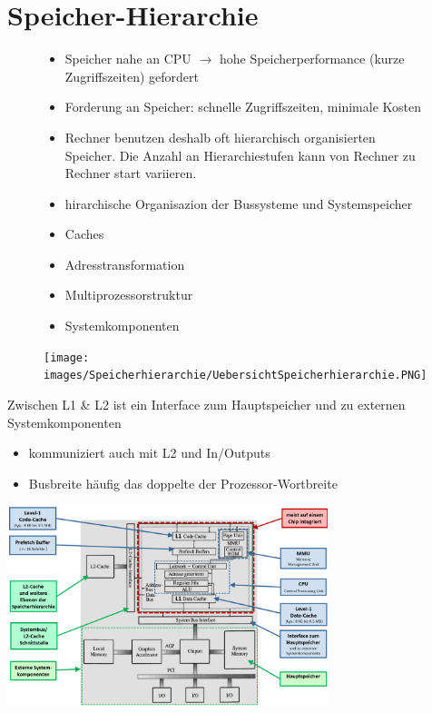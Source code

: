




\section{Speicher-Hierarchie}

\begin{figure}[htbp]

	\begin{minipage}{0.5\textwidth}		
		\begin{itemize}[noitemsep,topsep=0pt]
			\item Speicher nahe an CPU $\rightarrow$ hohe Speicherperformance (kurze Zugriffszeiten) gefordert
			\item Forderung an Speicher: schnelle Zugriffszeiten, minimale Kosten
			\item Rechner benutzen deshalb oft hierarchisch organisierten Speicher. Die Anzahl an Hierarchiestufen kann von Rechner zu Rechner start variieren.
		\end{itemize}
        \begin{itemize}
        \item hirarchische Organisazion der Bussysteme und Systemspeicher
        \item Caches
        \item Adresstransformation
        \item Multiprozessorstruktur
        \item Systemkomponenten 
    \end{itemize}	
	\end{minipage}
	\hfill		
	\begin{minipage}{0.45\textwidth} 
		\texttt{[image: images/Speicherhierarchie/UebersichtSpeicherhierarchie.PNG]}
	\end{minipage}
	
\end{figure}
Zwischen L1 \& L2 ist ein Interface zum Hauptspeicher und zu externen Systemkomponenten
\begin{itemize}
    \item kommuniziert auch mit L2 und In/Outputs
    \item Busbreite häufig das doppelte der Prozessor-Wortbreite
\end{itemize}
\begin{minipage}{\linewidth}
    \includegraphics[width=0.7\textwidth]{images/SystembusSpeicherSpeichersystem/SpeicherSysStrukt}\centering
\end{minipage}\newline


